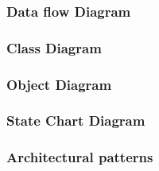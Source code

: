 \documentclass{article}
\begin{document}
	\subsubsection{Data flow Diagram}		
	\subsubsection{Class Diagram}
	\subsubsection{Object Diagram}		
	\subsubsection{State Chart Diagram}
	\subsubsection{Architectural patterns}


	\newpage
	
	
\end{document}
